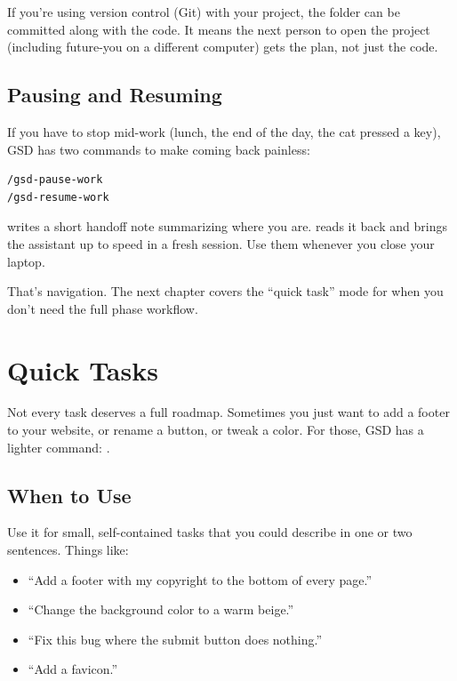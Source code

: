 \documentclass[11pt,letterpaper,openany]{book}
\begin{document}
\begin{gsdnote}
If you're using version control (Git) with your project, the
 folder can be committed along with the code. It
means the next person to open the project (including future-you on a
different computer) gets the plan, not just the code.
\end{gsdnote}

\section{Pausing and Resuming}

If you have to stop mid-work (lunch, the end of the day, the cat
pressed a key), GSD has two commands to make coming back painless:

\begin{lstlisting}
/gsd-pause-work
/gsd-resume-work
\end{lstlisting}

 writes a short handoff note summarizing where
you are.  reads it back and brings the assistant
up to speed in a fresh session. Use them whenever you close your
laptop.

\bigskip
\noindent That's navigation. The next chapter covers the ``quick task''
mode for when you don't need the full phase workflow.

\chapter{Quick Tasks}

Not every task deserves a full roadmap. Sometimes you just want to
add a footer to your website, or rename a button, or tweak a color.
For those, GSD has a lighter command: .

\section{When to Use \texorpdfstring{}{/gsd-quick}}

Use it for small, self-contained tasks that you could describe in
one or two sentences. Things like:

\begin{itemize}
  \item ``Add a footer with my copyright to the bottom of every page.''
  \item ``Change the background color to a warm beige.''
  \item ``Fix this bug where the submit button does nothing.''
  \item ``Add a favicon.''
\end{itemize}
\end{document}
